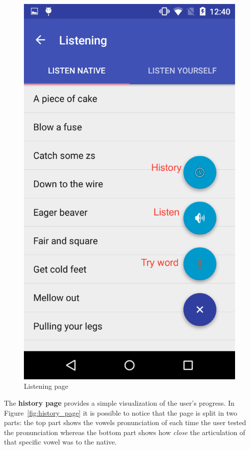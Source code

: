 \begin{figure}[!ht]
\begin{minipage}{.5\textwidth}
		\includegraphics[scale=0.18]{Figures/screenshots/listening.png}
		\caption{Listening page}
		\label{fig:listening_page}
	\end{minipage}
\end{figure}

\noindent The \textbf{history page} provides a simple visualization of the user's progress. In Figure~\ref{fig:history_page} it is possible to notice that the page is split in two parts: the top part shows the vowels pronunciation of each time the user tested the pronunciation whereas the bottom part shows how \textit{close} the articulation of that specific vowel was to the native. \\

